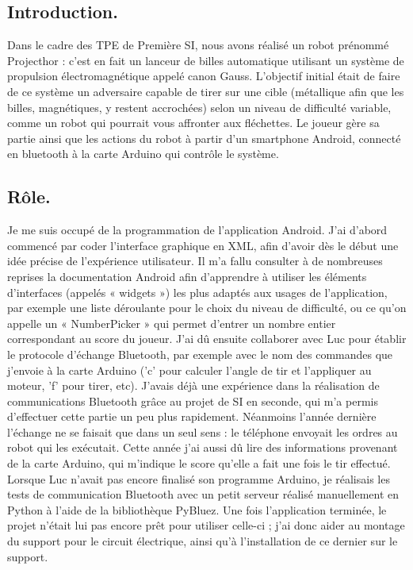 \subsection{Introduction.}

Dans le cadre des TPE de Première SI, nous avons réalisé un robot prénommé Projecthor : c'est en fait un lanceur de billes automatique utilisant un système de propulsion électromagnétique appelé canon Gauss. L'objectif initial était de faire de ce système un adversaire capable de tirer sur une cible (métallique afin que les billes, magnétiques, y restent accrochées) selon  un niveau de difficulté variable, comme un robot qui pourrait vous affronter aux fléchettes. Le joueur gère sa partie ainsi que les actions du robot à partir d'un smartphone Android, connecté en bluetooth à la carte Arduino qui contrôle le système.

\subsection{Rôle.}

Je me suis occupé de la programmation de l'application Android. J'ai d'abord commencé par coder l'interface graphique en XML, afin d'avoir dès le début une idée précise de l'expérience utilisateur. Il m'a fallu consulter à de nombreuses reprises la documentation Android afin d'apprendre à utiliser les éléments d'interfaces (appelés « widgets ») les plus adaptés aux usages de l'application, par exemple une liste déroulante pour le choix du niveau de difficulté, ou ce qu'on appelle un « NumberPicker » qui permet d'entrer un nombre entier correspondant au score du joueur. 
J'ai dû ensuite collaborer avec Luc pour établir le protocole d'échange Bluetooth, par exemple avec le nom des commandes que j'envoie à la carte Arduino ('c' pour calculer l'angle de tir et l'appliquer au moteur, 'f' pour tirer, etc). J'avais déjà une expérience dans la réalisation de communications Bluetooth grâce au projet de SI en seconde, qui m'a permis d'effectuer cette partie un peu plus rapidement. Néanmoins l'année dernière l'échange ne se faisait que dans un seul sens : le téléphone envoyait les ordres au robot qui les exécutait. Cette année j'ai aussi dû lire des informations provenant de la carte Arduino, qui m'indique le score qu'elle a fait une fois le tir effectué. Lorsque Luc n'avait pas encore finalisé son programme Arduino, je réalisais les tests de communication Bluetooth avec un petit serveur réalisé manuellement en Python à l'aide de la bibliothèque PyBluez.
Une fois l'application terminée, le projet n'était lui pas encore prêt pour utiliser celle-ci ; j'ai donc aider au montage du support pour le circuit électrique, ainsi qu'à l'installation de ce dernier sur le support.

